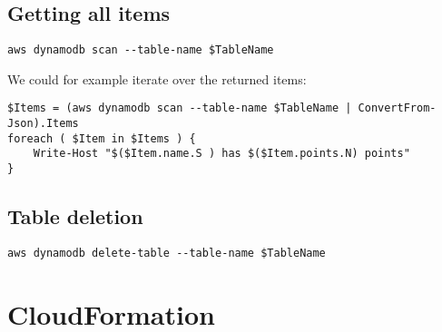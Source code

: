 \documentclass[slides]{pgnotes}
\begin{document}
\subsection{Getting all items}\label{sec:getting-all-items}

\begin{verbatim}
aws dynamodb scan --table-name $TableName
\end{verbatim}

We could for example iterate over the returned items:

\begin{verbatim}
$Items = (aws dynamodb scan --table-name $TableName | ConvertFrom-Json).Items
foreach ( $Item in $Items ) {
    Write-Host "$($Item.name.S ) has $($Item.points.N) points"
}
\end{verbatim}

\subsection{Table deletion}\label{sec:table-deletion}

\begin{verbatim}
aws dynamodb delete-table --table-name $TableName
\end{verbatim}

\section{CloudFormation}

\inputminted{yaml}{dynamodb_template.yml}
\end{document}
